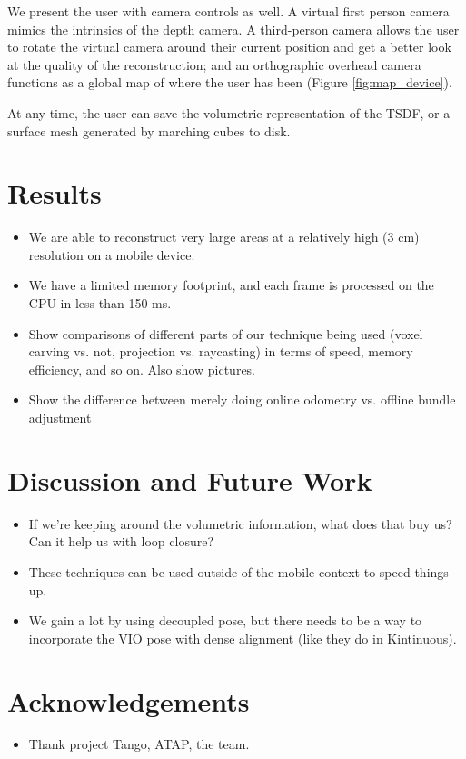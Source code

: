 \documentclass[conference,10pt]{IEEEtran}
\begin{document}
We present the user with camera controls as well. A virtual first person
camera mimics the intrinsics of the depth camera. A third-person camera allows
the user to rotate the virtual camera around their current position and get a
better look at the quality of the reconstruction; and an orthographic overhead
camera functions as a global map of where the user has been (Figure
\ref{fig:map_device}).

At any time, the user can save the volumetric representation of the TSDF, or a
surface mesh generated by marching cubes to disk.

\section{Results}
\begin{itemize}
    \item We are able to reconstruct very large areas at a relatively high (3
    cm) resolution on a mobile device.
    \item We have a limited memory footprint, and each frame is processed on
    the CPU in less than 150 ms.
    \item Show comparisons of different parts of our technique being used
    (voxel carving vs. not, projection vs. raycasting) in terms of speed, memory
    efficiency, and so on. Also show pictures.
    \item Show the difference between merely doing online odometry vs. offline
    bundle adjustment
\end{itemize}

\section{Discussion and Future Work}
\begin{itemize}
    \item If we're keeping around the volumetric information, what does that buy
    us? Can it help us with loop closure?
    \item These techniques can be used outside of the mobile context to speed
    things up.
    \item We gain a lot by using decoupled pose, but there needs to be a way to
    incorporate the VIO pose with dense alignment (like they do in Kintinuous).
\end{itemize}

\section{Acknowledgements}
\begin{itemize}
    \item Thank project Tango, ATAP, the team.
\end{itemize}


 
\end{document}
